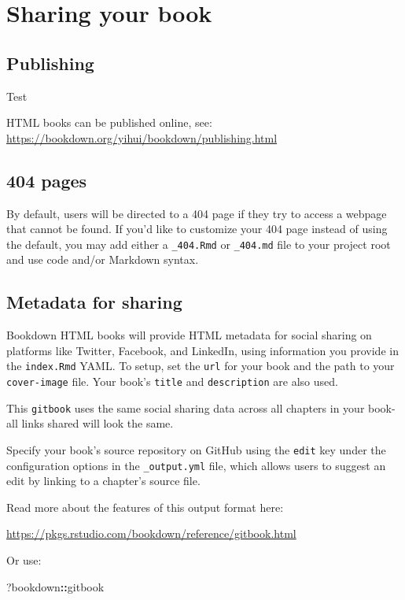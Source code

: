 \documentclass[
]{article}
\author{}
\date{\vspace{-2.5em}}
\newenvironment{Shaded}{\begin{snugshade}}{\end{snugshade}}
\newcommand{\NormalTok}[1]{#1}
\newcommand{\SpecialCharTok}[1]{\textcolor[rgb]{0.81,0.36,0.00}{\textbf{#1}}}
\begin{document}
\hypertarget{sharing-your-book}{%
\section{Sharing your book}\label{sharing-your-book}}

\hypertarget{publishing}{%
\subsection{Publishing}\label{publishing}}

Test

HTML books can be published online, see:
\url{https://bookdown.org/yihui/bookdown/publishing.html}

\hypertarget{pages}{%
\subsection{404 pages}\label{pages}}

By default, users will be directed to a 404 page if they try to access a
webpage that cannot be found. If you'd like to customize your 404 page
instead of using the default, you may add either a \texttt{\_404.Rmd} or
\texttt{\_404.md} file to your project root and use code and/or Markdown
syntax.

\hypertarget{metadata-for-sharing}{%
\subsection{Metadata for sharing}\label{metadata-for-sharing}}

Bookdown HTML books will provide HTML metadata for social sharing on
platforms like Twitter, Facebook, and LinkedIn, using information you
provide in the \texttt{index.Rmd} YAML. To setup, set the \texttt{url}
for your book and the path to your \texttt{cover-image} file. Your
book's \texttt{title} and \texttt{description} are also used.

This \texttt{gitbook} uses the same social sharing data across all
chapters in your book- all links shared will look the same.

Specify your book's source repository on GitHub using the \texttt{edit}
key under the configuration options in the \texttt{\_output.yml} file,
which allows users to suggest an edit by linking to a chapter's source
file.

Read more about the features of this output format here:

\url{https://pkgs.rstudio.com/bookdown/reference/gitbook.html}

Or use:

\begin{Shaded}
\begin{Highlighting}[]
\NormalTok{?bookdown}\SpecialCharTok{::}\NormalTok{gitbook}
\end{Highlighting}
\end{Shaded}
\end{document}
